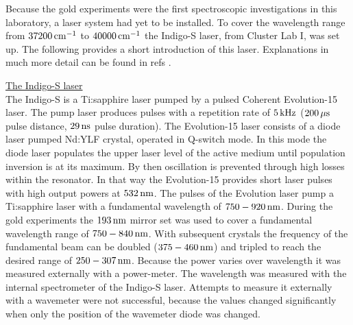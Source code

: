 \documentclass[parskip,12pt,headsepline,a4paper] {scrbook}
\begin{document}
Because the gold experiments were the first spectroscopic investigations in this laboratory, a laser system had yet to be installed. To cover the wavelength range from $\unit[37200]{cm^{-1}}$ to $\unit[40000]{cm^{-1}}$ the Indigo-S laser, from Cluster Lab I, was set up. The following provides a short introduction of this laser. Explanations in much more detail can be found in refs \cite{lackner} \cite{pifrader}.

\underline{The Indigo-S laser} \\
The Indigo-S is a Ti:sapphire laser pumped by a pulsed Coherent Evolution-15 laser. The pump laser produces pulses with a repetition rate of $\unit[5]{kHz}$ ($\unit[200]{\mu s}$ pulse distance, $\unit[29]{ns}$ pulse duration). The Evolution-15 laser consists of a diode laser pumped Nd:YLF crystal, operated in Q-switch mode. In this mode the diode laser populates the upper laser level of the active medium until population inversion is at its maximum. By then oscillation is prevented through high losses within the resonator. In that way the Evolution-15 provides short laser pulses with high output powers at $\unit[532]{nm}$. The pulses of the Evolution laser pump a Ti:sapphire laser with a fundamental wavelength of $\unit[750-920]{nm}$. During the gold experiments the $\unit[193]{nm}$ mirror set was used to cover a fundamental wavelength range of $\unit[750-840]{nm}$. With subsequent crystals the frequency of the fundamental beam can be doubled ($\unit[375-460]{nm}$) and tripled to reach the desired range of $\unit[250-307]{nm}$. Because the power varies over wavelength it was measured externally with a power-meter. The wavelength was measured with the internal spectrometer of the Indigo-S laser. Attempts to measure it externally with a wavemeter were not successful, because the values changed significantly when only the position of the wavemeter diode was changed.
\end{document}
